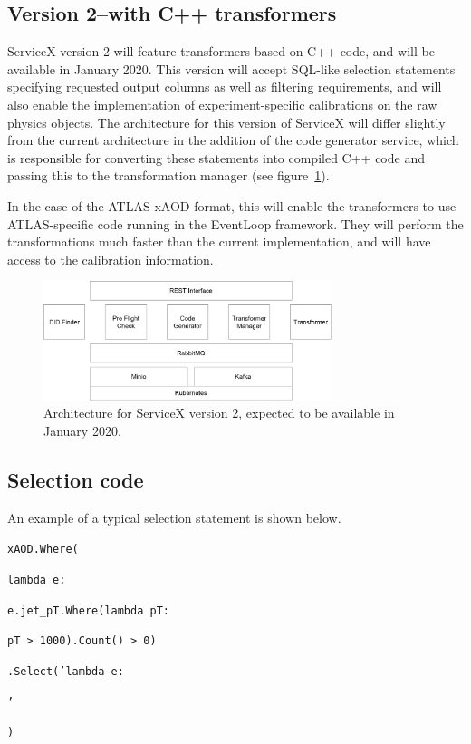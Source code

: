 \documentclass{webofc}
\begin{document}
\subsection{Version 2--with C++ transformers}
\label{subsec:v2}

ServiceX version 2 will feature transformers based on C++ code, and will be available in January
2020. This version will accept SQL-like selection statements specifying requested output columns as
well as filtering requirements, and will also enable the implementation of experiment-specific
calibrations on the raw physics objects. The architecture for this version of ServiceX will differ
slightly from the current architecture in the addition of the code generator service, which is
responsible for converting these statements into compiled C++ code and passing this to the
transformation manager (see figure~\ref{fig:architectureV2}).

In the case of the ATLAS xAOD format, this will enable the transformers to use ATLAS-specific code
running in the EventLoop framework. They will perform the transformations much faster than the
current implementation, and will have access to the calibration information.

\begin{figure}[ht]
  \centering
  \includegraphics[width=0.75\textwidth]{architectureV2}
  \caption{Architecture for ServiceX version 2, expected to be available in January 2020.}
  \label{fig:architectureV2}
\end{figure}

\subsection{Selection code}
\label{subsec:select}

An example of a typical selection statement is shown below.

\bigskip

{\raggedright \footnotesize
  \texttt{xAOD.Where(}

  \texttt{\quad lambda e: }

  \texttt{\quad \quad e.jet\_pT.Where(lambda pT: }

  \texttt{\quad \quad pT > 1000).Count() > 0)}

  \texttt{\quad .Select('lambda e: }

  \texttt{\quad {}'}

  \texttt{)}
}
\end{document}
